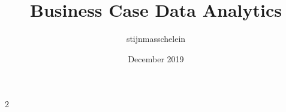 \documentclass{article}
\title{Business Case Data Analytics}
\author{stijnmasschelein }
\date{December 2019}
\begin{document}
\begin{multicols}{2}
\end{multicols}{2}
\end{document}
